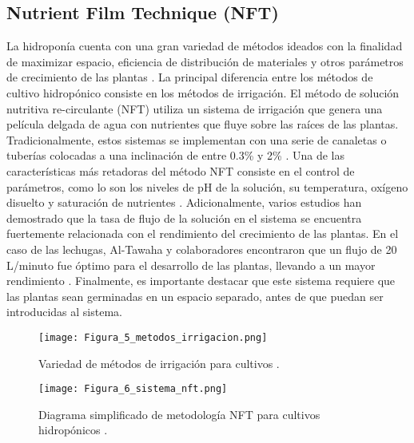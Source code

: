 \subsection*{Nutrient Film Technique (NFT)}
La hidroponía cuenta con una gran variedad de métodos ideados con la finalidad de maximizar espacio, eficiencia de distribución de materiales y otros parámetros de crecimiento de las plantas \cite{rajaseger_hydroponics_2023}. La principal diferencia entre los métodos de cultivo hidropónico consiste en los métodos de irrigación. El método de solución nutritiva re-circulante (NFT) utiliza un sistema de irrigación que genera una película delgada de agua con nutrientes que fluye sobre las raíces de las plantas. Tradicionalmente, estos sistemas se implementan con una serie de canaletas o tuberías colocadas a una inclinación de entre 0.3\% y 2\% \cite{van_os_technical_2019}. Una de las características más retadoras del método NFT consiste en el control de parámetros, como lo son los niveles de pH de la solución, su temperatura, oxígeno disuelto y saturación de nutrientes \cite{baiyin_flow_rate_2021}. Adicionalmente, varios estudios han demostrado que la tasa de flujo de la solución en el sistema se encuentra fuertemente relacionada con el rendimiento del crecimiento de las plantas. En el caso de las lechugas, Al-Tawaha y colaboradores encontraron que un flujo de 20 L/minuto fue óptimo para el desarrollo de las plantas, llevando a un mayor rendimiento \cite{al-tawaha_flow_rate_nft_2018}. Finalmente, es importante destacar que este sistema requiere que las plantas sean germinadas en un espacio separado, antes de que puedan ser introducidas al sistema.

\begin{figure}[H]
	\centering
	\texttt{[image: Figura\_5\_metodos\_irrigacion.png]}
	\caption{Variedad de métodos de irrigación para cultivos \cite{van_os_technical_2019}.}
	\label{fig:mesh5}
\end{figure}

\begin{figure}[H]
	\centering
	\texttt{[image: Figura\_6\_sistema\_nft.png]}
	\caption{Diagrama simplificado de metodología NFT para cultivos hidropónicos \cite{NutrientFilmTechnique_2023}.}
	\label{fig:mesh6}
\end{figure}

